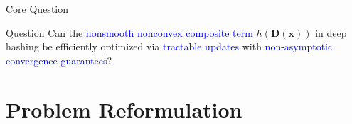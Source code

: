 \documentclass[mathserif,compress,override,9pt]{beamer}
\numberwithin{equation}{section}
\newcommand{\prox}{\mathrm{prox}}
\newcommand{\bx}{\bm{x}}
\newcommand{\by}{\bm{y}}
\newcommand{\bA}{\bm{A}}
\newcommand{\bD}{\bm{D}}
\newcommand{\bM}{\bm{M}}
\newcommand{\blue}[1]{\textcolor{blue}{#1}}
\theoremstyle{remark}
\begin{document}

\begin{frame}{Core Question}
\begin{block}{Question}
  \centering
  Can the \blue{nonsmooth nonconvex composite term}
  \(h(\bD(\bx))\) in deep hashing be efficiently
  optimized via \blue{tractable updates} with \blue{non-asymptotic convergence guarantees}?
\end{block}
\end{frame}

\section{Problem Reformulation}
\end{document}
